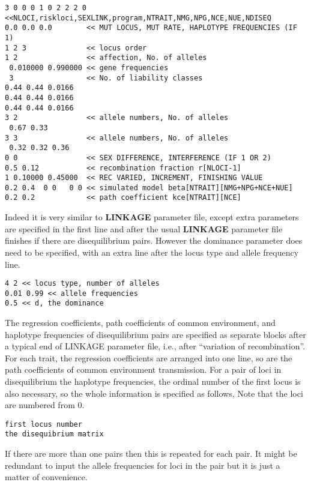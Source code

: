 \documentclass[12pt]{article}
\begin{document}
\begin{small}\begin{verbatim}
3 0 0 0 1 0 2 2 2 0 <<NLOCI,riskloci,SEXLINK,program,NTRAIT,NMG,NPG,NCE,NUE,NDISEQ
0.0 0.0 0.0        << MUT LOCUS, MUT RATE, HAPLOTYPE FREQUENCIES (IF 1)
1 2 3              << locus order
1 2                << affection, No. of alleles
 0.010000 0.990000 << gene frequencies
 3                 << No. of liability classes
0.44 0.44 0.0166
0.44 0.44 0.0166
0.44 0.44 0.0166
3 2                << allele numbers, No. of alleles
 0.67 0.33
3 3                << allele numbers, No. of alleles
 0.32 0.32 0.36
0 0                << SEX DIFFERENCE, INTERFERENCE (IF 1 OR 2)
0.5 0.12           << recombination fraction r[NLOCI-1]
1 0.10000 0.45000  << REC VARIED, INCREMENT, FINISHING VALUE
0.2 0.4  0 0   0 0 << simulated model beta[NTRAIT][NMG+NPG+NCE+NUE]
0.2 0.2            << path coefficient kce[NTRAIT][NCE]
\end{verbatim}\end{small}

Indeed it is very similar to {\bf LINKAGE} parameter file, except extra parameters
are specified in the first line and after the usual {\bf LINKAGE} parameter file
finishes if there are disequilibrium pairs. However the dominance parameter does
need to be specified, with an extra line after the locus type and allele frequency line.
\begin{verbatim}
4 2 << locus type, number of alleles
0.01 0.99 << allele frequencies
0.5 << d, the dominance
\end{verbatim}

The regression coefficients, path coefficients of common environment, and haplotype
frequencies of disequilibrium pairs are specified as separate blocks after a typical
end of LINKAGE parameter file, i.e., after ``variation of recombination''.
For each trait, the regression coefficients are arranged into one line, so are
the path coefficients of common environment transmission.
For a pair of loci in disequilibrium the haplotype frequencies, the ordinal number
of the first locus is also necessary, so the whole information is specified as
follows, Note that the loci are numbered from 0.

\begin{verbatim}
first locus number
the disequibrium matrix
\end{verbatim}
If there are more than one pairs then this is repeated for each pair. It might be
redundant to input the allele frequencies for loci in the pair but it is just a
matter of convenience.
\end{document}
